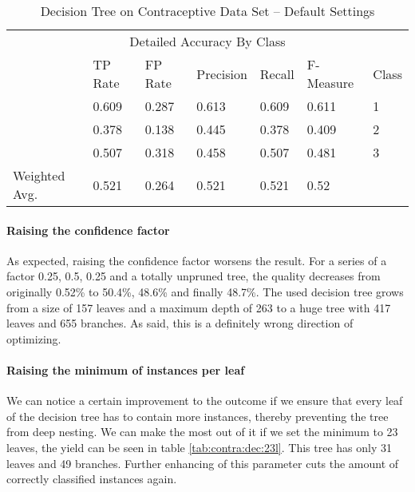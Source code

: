 \documentclass[paper=a4, fontsize=11pt]{scrartcl} %
\numberwithin{equation}{section} %
\numberwithin{figure}{section} %
\numberwithin{table}{section} %
\begin{document}
\begin{table*}[htb]\centering
  \begin{tabular*}{\columnwidth}{@{}lllllll@{}}
      \toprule 
      \multicolumn{7}{c}{Detailed Accuracy By Class} \\ 
               &  TP Rate & FP Rate & Precision & Recall & F-Measure &  Class \\ \midrule 
               &  0.609   & 0.287   & 0.613     & 0.609  & 0.611     &  1     \\  
               &  0.378   & 0.138   & 0.445     & 0.378  & 0.409     &  2     \\      
               &  0.507   & 0.318   & 0.458     & 0.507  & 0.481     &  3     \\      
Weighted Avg.  &  0.521   & 0.264   & 0.521     & 0.521  & 0.52      &        \\ \bottomrule     
    \end{tabular*}
\caption{Decision Tree on Contraceptive Data Set -- Default Settings} 
\label{tab:contra:dec:default}
\end{table*}
\FloatBarrier

\paragraph{Raising the confidence factor}
As expected, raising the confidence factor worsens the result. For a series of a factor 0.25, 0.5, 0.25 and a totally unpruned tree, the quality decreases from originally 0.52\% to 50.4\%, 48.6\% and finally 48.7\%. The used decision tree grows from a size of 157 leaves and a maximum depth of 263 to a huge tree with 417 leaves and 655 branches. As said, this is a definitely wrong direction of optimizing.

\paragraph{Raising the minimum of instances per leaf}
We can notice a certain improvement to the outcome if we ensure that every leaf of the decision tree has to contain more instances, thereby preventing the tree from deep nesting. We can make the most out of it if we set the minimum to 23 leaves, the yield can be seen in table \ref{tab:contra:dec:23l}. This tree has only 31 leaves and 49 branches. Further enhancing of this parameter cuts the amount of correctly classified instances again.
\end{document}
